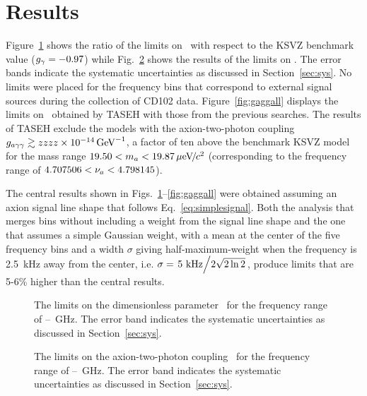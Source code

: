 \newpage
\section{Results} \label{sec:results}
Figure~\ref{fig:glimit} shows the ratio of the limits on \ggamma\ with respect 
to the KSVZ benchmark value ($g_{\gamma}=-0.97$) while Fig.~\ref{fig:gagglimit} 
shows the results of the limits on \gagg. 
The error bands indicate the systematic uncertainties as discussed in 
Section~\ref{sec:sys}. No limits were placed for the frequency bins 
that correspond to external signal sources during the collection of CD102 
data. Figure~\ref{fig:gaggall} displays 
the limits on \gagg\ obtained by TASEH with those from the previous searches. 
The results of TASEH exclude the models with the axion-two-photon
coupling $g_{a\gamma\gamma}\gtrsim zzzz\times 10^{-14}\,\text{Ge\hspace{-.08em}V}^{-1}$, a factor of ten above the benchmark
KSVZ model for the mass range $19.50 < m_a < 19.87 \,\mu\text{e\hspace{-.08em}V\hspace{-0.16em}/\hspace{-0.08em}}c^2$ (corresponding to 
the frequency range of $4.707506 < \nu_a < 4.798145$). 

The central results shown in Figs.~\ref{fig:glimit}--\ref{fig:gaggall} were 
obtained assuming an axion signal line shape that follows 
Eq.~\ref{eq:simplesignal}. Both the analysis that merges bins without including
 a weight from the signal line shape and the one 
that assumes a simple Gaussian weight, with a mean at the center of the five 
frequency bins and a width $\sigma$ 
giving half-maximum-weight when the frequency 
is 2.5~kHz away from the center, i.e. 
$\sigma=\left.5~\text{kHz}\middle/2\sqrt{2\ln2}\right.$, produce limits that 
are 5-6\% higher than the central results. 

\begin{figure} [htbp]
  \centering
  \caption{The limits on the dimensionless parameter \ggamma\ for the 
frequency range of \flo--\fhi~GHz. The error band indicates the systematic 
  uncertainties as discussed in Section~\ref{sec:sys}. }
  \label{fig:glimit}
\end{figure}

\begin{figure} [htbp]
  \centering
  \caption{The limits on the axion-two-photon coupling \gagg\ for the frequency 
range of \flo--\fhi~GHz. The error band indicates the systematic 
  uncertainties as discussed in Section~\ref{sec:sys}. }
  \label{fig:gagglimit}
\end{figure}

